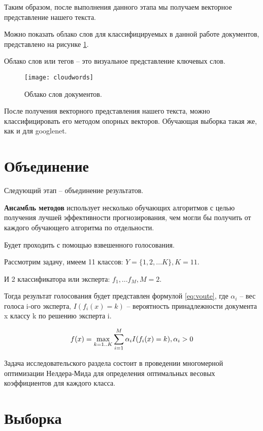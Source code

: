 Таким образом, после выполнения данного этапа мы получаем векторное представление нашего текста.

Можно показать облако слов для классифицируемых в данной работе документов, представлено на рисунке \ref{img:cloudwords}. 

Облако слов или тегов -- это визуальное представление ключевых слов. 

\begin{figure}[H]
	\centering
	\texttt{[image: cloudwords]}
	\caption{Облако слов документов. }
	\label{img:cloudwords}
\end{figure}

После получения векторного представления нашего текста, можно классифицировать его методом опорных векторов. Обучающая выборка такая же, как и для googlenet.

\section{Объединение}

Следующий этап -- объединение результатов.

\textbf{Ансамбль методов} использует несколько обучающих алгоритмов с целью получения лучшей эффективности прогнозирования, чем могли бы получить от каждого обучающего алгоритма по отдельности.

Будет проходить с помощью взвешенного голосования.

Рассмотрим задачу, имеем 11 классов: $Y=\{1,2,...K\}, K=11$.

И 2 классификатора или эксперта: $f_1, ...f_M, M=2$.

Тогда результат голосования будет представлен формулой \ref{eq:voute}, где $\alpha_i$ -- вес голоса i-ого эксперта, $I(f_i(x)=k)$ -- вероятность принадлежности документа x классу k по решению эксперта i.

\begin{equation}
	\centering
	f(x)=\max_{k=1..K}\sum_{i=1}^M\alpha_i I(f_i(x)=k), \alpha_i>0
	\label{eq:voute}
\end{equation}

Задача исследовательского раздела состоит в проведении многомерной оптимизации Нелдера-Мида для определения оптимальных весовых коэффициентов для каждого класса.

\section{Выборка}

